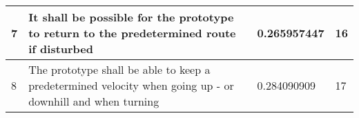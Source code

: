 \begin{table}[H]
\begin{tabular}{|p{2cm}|p{5cm}|p{6cm}|p{3cm}|}
\hline%
           7    &   It shall be possible for the prototype to return to the predetermined route if disturbed   &  0.265957447    &   16            \\ 
\hline%
           8    &   The prototype shall be able to keep a predetermined velocity when going up - or downhill and when turning   &   0.284090909   &    17             \\
\hline%
\end{tabular}
\label{tab:AcceptTestTestProcedure}
\end{table}

